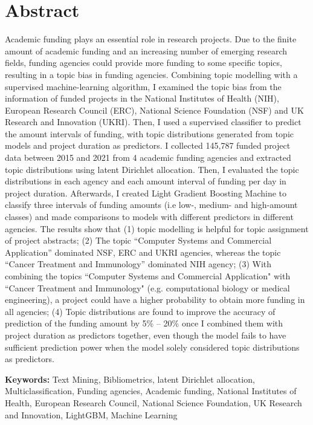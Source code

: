 \section{Abstract}

Academic funding plays an essential role in research projects. Due to the finite amount of academic funding and an increasing number of emerging research fields, funding agencies could provide more funding to some specific topics, resulting in a topic bias in funding agencies. Combining topic modelling with a supervised machine-learning algorithm, I examined the topic bias from the information of funded projects in the National Institutes of Health (NIH), European Research Council (ERC), National Science Foundation (NSF) and UK Research and Innovation (UKRI). Then, I used a supervised classifier to predict the amount intervals of funding, with topic distributions generated from topic models and project duration as predictors. I collected 145,787 funded project data between 2015 and 2021 from 4 academic funding agencies and extracted topic distributions using latent Dirichlet allocation. Then, I evaluated the topic distributions in each agency and each amount interval of funding per day in project duration. Afterwards, I created Light Gradient Boosting Machine to classify three intervals of funding amounts (i.e low-, medium- and high-amount classes) and made comparisons to models with different predictors in different agencies. The results show that (1) topic modelling is helpful for topic assignment of project abstracts; (2) The topic “Computer Systems and Commercial Application” dominated NSF, ERC and UKRI agencies, whereas the topic “Cancer Treatment and Immunology” dominated NIH agency; (3) With combining the topics ``Computer Systems and Commercial Application" with ``Cancer Treatment and Immunology" (e.g. computational biology or medical engineering), a project could have a higher probability to obtain more funding in all agencies; (4) Topic distributions are found to improve the accuracy of prediction of the funding amount by 5\% -- 20\% once I combined them with project duration as predictors together, even though the model fails to have sufficient prediction power when the model solely considered topic distributions as predictors.

\textbf{Keywords: } Text Mining, Bibliometrics, latent Dirichlet allocation, Multiclassification, Funding agencies, Academic funding, National Institutes of Health, European Research Council, National Science Foundation, UK Research and Innovation, LightGBM, Machine Learning
